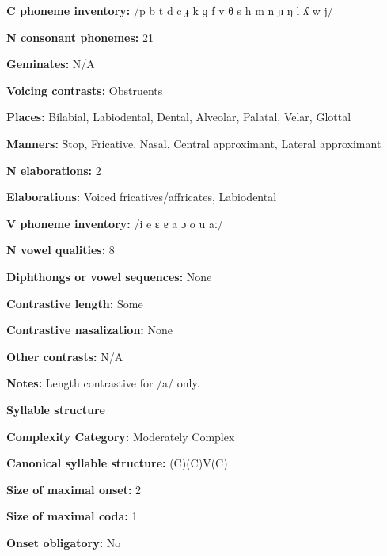\textbf{C phoneme inventory:} /p b t d c ɟ k ɡ f v θ s h m n ɲ ŋ l ʎ w j/



\textbf{N consonant phonemes:} 21



\textbf{Geminates:} N/A



\textbf{Voicing contrasts:} Obstruents



\textbf{Places:} Bilabial, Labiodental, Dental, Alveolar, Palatal, Velar, Glottal



\textbf{Manners:} Stop, Fricative, Nasal, Central approximant, Lateral approximant



\textbf{N elaborations:} 2



\textbf{Elaborations:} Voiced fricatives/affricates, Labiodental



\textbf{V phoneme inventory:} /i e ɛ ɐ a ɔ o u aː/



\textbf{N vowel qualities:} 8



\textbf{Diphthongs or vowel sequences:} None



\textbf{Contrastive length:} Some



\textbf{Contrastive nasalization:} None



\textbf{Other contrasts:} N/A



\textbf{Notes:} Length contrastive for /a/ only.



\textbf{Syllable structure}



\textbf{Complexity Category:} Moderately Complex



\textbf{Canonical syllable structure:} (C)(C)V(C) \citep[123-7]{Clark2008}



\textbf{Size of maximal onset:} 2



\textbf{Size of maximal coda:} 1



\textbf{Onset obligatory:} No




